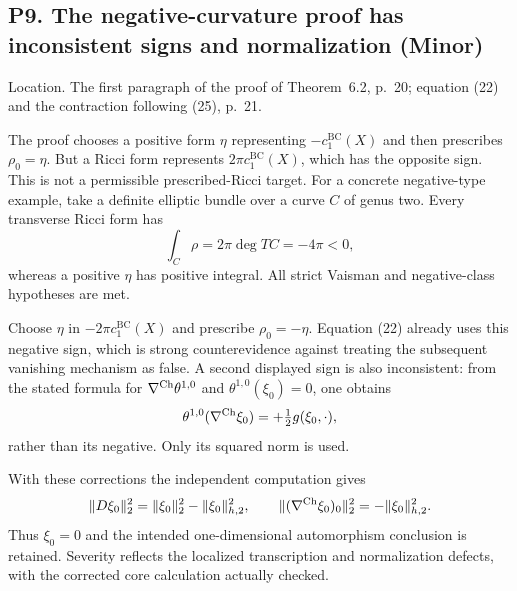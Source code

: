 \documentclass[10pt]{article}
\begin{document}
\subsection*{P9. The negative-curvature proof has inconsistent signs and normalization (Minor)}
Location. The first paragraph of the proof of Theorem 6.2, p. 20; equation (22) and the contraction following (25), p. 21.\par
The proof chooses a positive form \(\eta\) representing \(-c_1^{\mathrm{BC}}(X)\) and then prescribes \(\rho_0=\eta\). But a Ricci form represents \(2\pi c_1^{\mathrm{BC}}(X)\), which has the opposite sign. This is not a permissible prescribed-Ricci target. For a concrete negative-type example, take a definite elliptic bundle over a curve \(C\) of genus two. Every transverse Ricci form has \[\int_C\rho=2\pi\deg TC=-4\pi<0,\] whereas a positive \(\eta\) has positive integral. All strict Vaisman and negative-class hypotheses are met.\par
Choose \(\eta\) in \(-2\pi c_1^{\mathrm{BC}}(X)\) and prescribe \(\rho_0=-\eta\). Equation (22) already uses this negative sign, which is strong counterevidence against treating the subsequent vanishing mechanism as false. A second displayed sign is also inconsistent: from the stated formula for \(\nabla^{\rm Ch}\theta^{1,0}\) and \(\theta^{1,0}(\xi_0)=0\), one obtains \[\theta^{1,0}(\nabla^{\rm Ch}\xi_0)
    =+\tfrac12 g(\xi_0,\cdot),\] rather than its negative. Only its squared norm is used.\par
With these corrections the independent computation gives \[\|D\xi_0\|_2^2=\|\xi_0\|_2^2-\|\xi_0\|_{h,2}^2,\qquad
 \|(\nabla^{\rm Ch}\xi_0)_0\|_2^2
                       =-\|\xi_0\|_{h,2}^2.\] Thus \(\xi_0=0\) and the intended one-dimensional automorphism conclusion is retained. Severity reflects the localized transcription and normalization defects, with the corrected core calculation actually checked.\par
\end{document}
